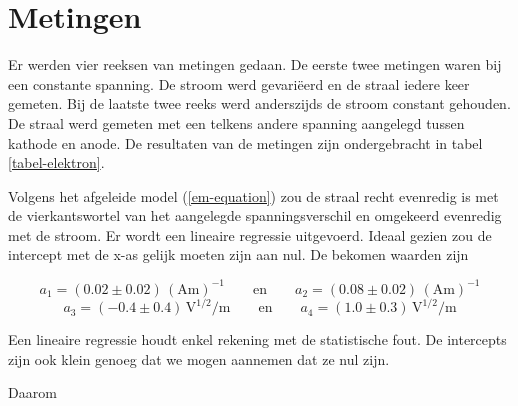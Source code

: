 \section{Metingen}


Er werden vier reeksen van metingen gedaan. De eerste twee metingen waren bij 
een constante spanning. De stroom werd gevari\"eerd en de straal iedere keer 
gemeten.  Bij de laatste twee reeks werd anderszijds de stroom constant 
gehouden. De straal werd gemeten met een telkens andere spanning aangelegd 
tussen kathode en anode.  De resultaten van de metingen zijn ondergebracht in 
tabel \ref{tabel-elektron}.

Volgens het afgeleide model (\ref{em-equation}) zou de straal recht evenredig 
is met de vierkantswortel van het aangelegde spanningsverschil en omgekeerd 
evenredig met de stroom. Er wordt een lineaire regressie uitgevoerd.  Ideaal 
gezien zou de intercept met de x-as gelijk moeten zijn aan nul. De bekomen 
waarden zijn
\begin{center}
$$
a_1 = (0.02 \pm 0.02)\,(\textrm{Am})^{-1}
\qquad \textrm{en} \qquad
a_2 = (0.08 \pm 0.02)\,(\textrm{Am})^{-1}
$$
$$
a_3 = (-0.4 \pm 0.4)\,\textrm{V}^{1/2}\textrm{/m}
\qquad \textrm{en} \qquad
a_4 = (1.0 \pm 0.3)\,\textrm{V}^{1/2}\textrm{/m}
$$
\end{center}
Een lineaire regressie houdt enkel rekening met de statistische fout. De 
intercepts zijn ook klein genoeg dat we mogen aannemen dat ze nul zijn.

Daarom
